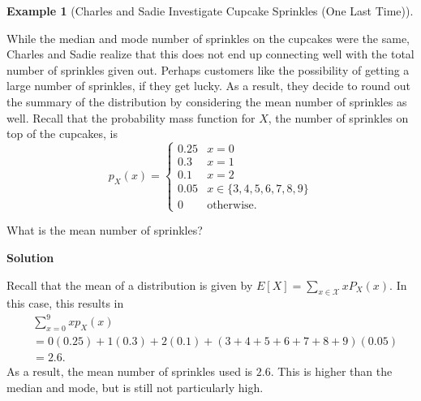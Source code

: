 \documentclass[
  letterpaper,
  DIV=11,
  numbers=noendperiod]{scrreprt}
\theoremstyle{definition}
\theoremstyle{definition}
\newtheorem{example}{Example}[chapter]
\theoremstyle{definition}
\theoremstyle{remark}
\begin{document}
\begin{example}[Charles and Sadie Investigate Cupcake Sprinkles (One
Last
Time)]\protect\hypertarget{exm-expected-value-one}{}\label{exm-expected-value-one}

While the median and mode number of sprinkles on the cupcakes were the
same, Charles and Sadie realize that this does not end up connecting
well with the total number of sprinkles given out. Perhaps customers
like the possibility of getting a large number of sprinkles, if they get
lucky. As a result, they decide to round out the summary of the
distribution by considering the mean number of sprinkles as well. Recall
that the probability mass function for \(X\), the number of sprinkles on
top of the cupcakes, is
\[p_X(x) = \begin{cases} 0.25 & x = 0 \\ 0.3 & x = 1 \\ 0.1 & x = 2 \\ 0.05 & x \in \{3,4,5,6,7,8,9\} \\ 0 & \text{otherwise}.\end{cases}\]

What is the mean number of sprinkles?

\begin{tcolorbox}[enhanced jigsaw, colback=white, colframe=quarto-callout-color-frame, arc=.35mm, leftrule=.75mm, rightrule=.15mm, opacityback=0, breakable, bottomrule=.15mm, left=2mm, toprule=.15mm]

\vspace{-3mm}\textbf{Solution}\vspace{3mm}

Recall that the mean of a distribution is given by
\(E[X] = \sum_{x\in\mathcal{X}}xP_X(x)\). In this case, this results in
\begin{align*}
    &\sum_{x=0}^9 xp_X(x) \\
    &= 0(0.25) + 1(0.3) + 2(0.1) + (3+4+5+6+7+8+9)(0.05) \\
    &= 2.6.
\end{align*} As a result, the mean number of sprinkles used is \(2.6\).
This is higher than the median and mode, but is still not particularly
high.

\end{tcolorbox}

\end{example}
\end{document}
